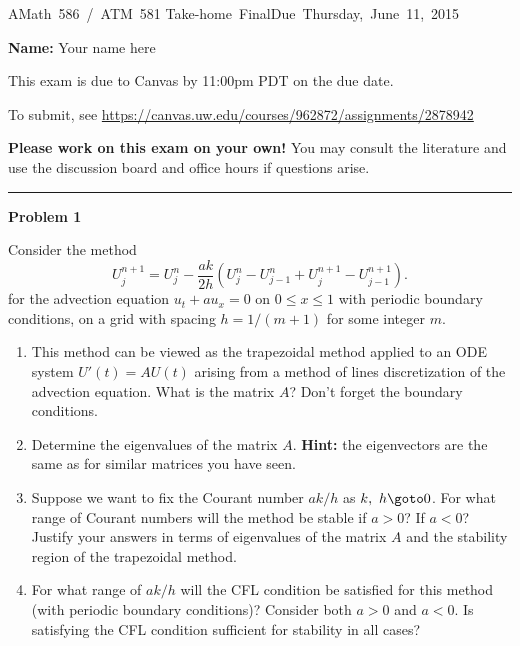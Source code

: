 \documentclass[10pt]{article}
\begin{document}
\hfill\vbox{\hbox{AMath 586 / ATM 581}
\hbox{Take-home Final}\hbox{Due Thursday, June 11, 2015}}

{\bf Name:} Your name here
\vskip 5pt

This exam is due to Canvas by 11:00pm PDT on the due date.

To submit, see \url{https://canvas.uw.edu/courses/962872/assignments/2878942}

{\bf Please work on this exam on your own!}  You may consult the literature
and use the discussion board and office hours if questions arise.


\vskip 1cm
\hrule
{\bf Problem 1}  

Consider the method
\begin{equation} \label{a}
U_j^{n+1} = U_j^n - \frac{ak}{2h}(U_j^n-U_{j-1}^n + U_j^{n+1}-U_{j-1}^{n+1}).
\end{equation}
for the advection equation $u_t+au_x=0$ on $0\leq x \leq 1$ with periodic
boundary conditions, on a grid with spacing $h= 1 / (m+1)$ for some integer
$m$.  

\begin{enumerate}
\item This method can be viewed as the trapezoidal method applied to an ODE
system $U'(t) = AU(t)$ arising from a method of lines discretization of the
advection equation.  What is the matrix $A$?  Don't forget the boundary
conditions.

\item Determine the eigenvalues of the matrix $A$.  {\bf Hint:} the
eigenvectors are the same as for similar matrices you have seen.

\item Suppose we want to fix the Courant number $ak/h$ as $k,~h\goto 0$.
For what range of Courant numbers will the method be stable if $a>0$?
If $a<0$?  Justify your answers in terms of eigenvalues of the matrix $A$
and  the stability region of the trapezoidal method.

\item For what range of $ak/h$ will the CFL condition be satisfied for this
method (with periodic boundary conditions)?  Consider both $a>0$ and $a<0$.
Is satisfying the CFL condition sufficient for stability in all cases?

\end{enumerate} 



\end{document}
